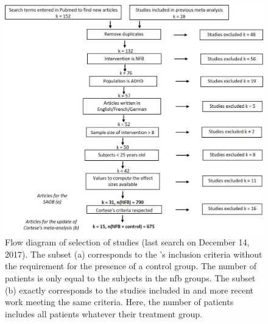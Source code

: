 \documentclass[12pt,a4paper,english]{article}
\begin{document}
\begin{figure}[h!]
  \centering
	\includegraphics[width=1.0\linewidth]{figures/meta_review_factors_analysis_how_studies_are_included_no_colors_2-columns_fitting_ima.jpg} 
  \caption{Flow diagram of selection of studies (last search on December 14, 2017).  
	The subset (a) corresponds to the \citeauthor{Cortese2016}'s inclusion criteria without the requirement for the presence of a control group. The number
	of patients is only equal to the subjects in the \gls{nfb} groups.
	The subset (b) exactly corresponds to the studies included in \citet{Cortese2016} and more recent work meeting the same criteria. Here, the number of patients includes all patients
	whatever their treatment group.}
  \label{Figure:systematic_review_workflow}
\end{figure}
\end{document}
